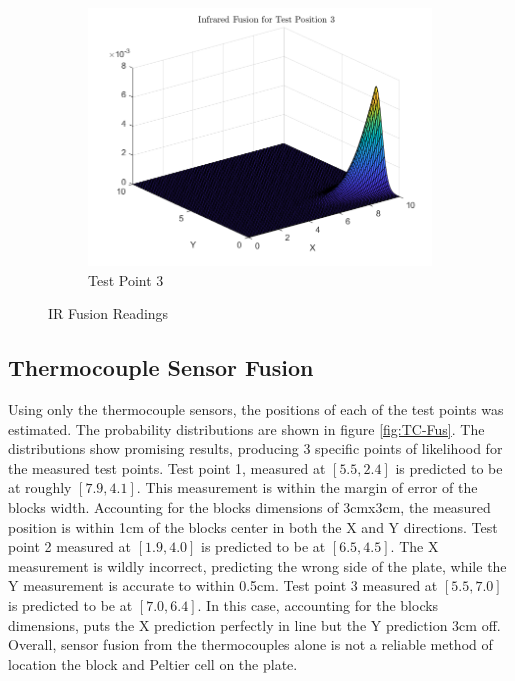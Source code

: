\documentclass[12pt]{article}
\begin{document}
\begin{figure}[H]
\begin{subfigure}[h]{0.45\textwidth}
        \includegraphics[width=\textwidth]{images/IR_FusionA3.png}
        \caption{Test Point 3}
        \label{fig:IR-Fus-3}
    \end{subfigure}
    \caption{IR Fusion Readings}
    \label{fig:IR-Fus}
\end{figure}

\subsection{Thermocouple Sensor Fusion}

Using only the thermocouple sensors, the positions of each of the test points was estimated. The probability distributions are shown in figure \ref{fig:TC-Fus}. The distributions show promising results, producing 3 specific points of likelihood for the measured test points. Test point 1, measured at $[5.5, 2.4]$ is predicted to be at roughly $[7.9, 4.1]$. This measurement is within the margin of error of the blocks width. Accounting for the blocks dimensions of 3cmx3cm, the measured position is within 1cm of the blocks center in both the X and Y directions. Test point 2 measured at $[1.9, 4.0]$ is predicted to be at $[6.5, 4.5]$. The X measurement is wildly incorrect, predicting the wrong side of the plate, while the Y measurement is accurate to within 0.5cm. Test point 3 measured at $[5.5, 7.0]$ is predicted to be at $[7.0, 6.4]$. In this case, accounting for the blocks dimensions, puts the X prediction perfectly in line but the Y prediction 3cm off. Overall, sensor fusion from the thermocouples alone is not a reliable method of location the block and Peltier cell on the plate.
\end{document}

